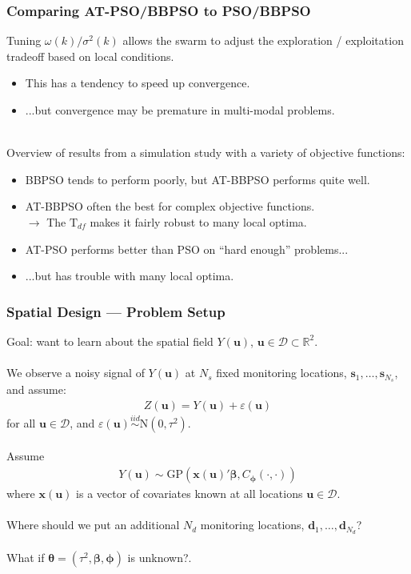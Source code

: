 \documentclass[xcolor=dvipsnames]{beamer}
\begin{document}
\begin{frame}
\frametitle{Comparing AT-PSO/BBPSO to PSO/BBPSO}
Tuning $\omega(k)/\sigma^2(k)$ allows the swarm to adjust the exploration / exploitation tradeoff based on local conditions.
\begin{itemize}
\item This has a tendency to speed up convergence.
\item ...but convergence may be premature in multi-modal problems.\\~\\
\end{itemize}

\pause

Overview of results from a simulation study with a variety of objective functions:
\begin{itemize}
\item BBPSO tends to perform poorly, but AT-BBPSO performs quite well.\\
\item AT-BBPSO often the best for complex objective functions.\\
$\to$ The $\mathrm{T}_{df}$ makes it fairly robust to many local optima.\pause
\item AT-PSO performs better than PSO on ``hard enough'' problems... \pause
\item ...but has trouble with many local optima.
\end{itemize}
\end{frame}

\begin{frame}
\frametitle{Spatial Design --- Problem Setup}
Goal: want to learn about the spatial field $Y(\bm{u})$, $\bm{u}\in\mathcal{D}\subset \mathbb{R}^2$. \pause\\~\\

We observe a noisy signal of $Y(\bm{u})$ at $N_s$ fixed monitoring locations, $\bm{s}_1, \dots, \bm{s}_{N_s}$,
and assume:
\begin{align*}
Z(\bm{u}) = Y(\bm{u}) + \varepsilon(\bm{u})
\end{align*}
for all $\bm{u}\in\mathcal{D}$, and $\varepsilon(\bm{u}) \stackrel{iid}{\sim} \mathrm{N}(0, \tau^2)$. \pause\\~\\

Assume
\begin{align*}
Y(\bm{u}) \sim \mathrm{GP}(\bm{x}(\bm{u})'\bm{\beta}, C_{\bm{\phi}}(\cdot, \cdot))
\end{align*}
where $\bm{x}(\bm{u})$ is a vector of covariates known at all locations $\bm{u}\in\mathcal{D}$. \pause \\~\\

Where should we put an additional $N_d$ monitoring locations, $\bm{d}_1, \dots, \bm{d}_{N_d}$? \pause \\~\\

What if $\bm{\theta} = (\tau^2, \bm{\beta}, \bm{\phi})$ is unknown?.
\end{frame}
\end{document}
